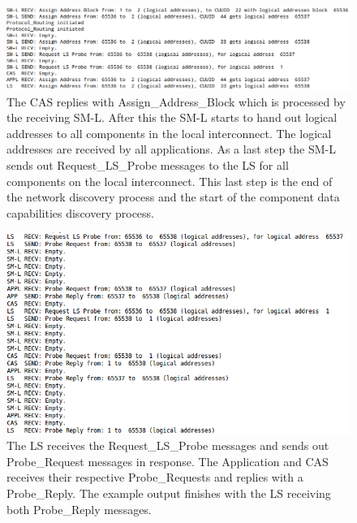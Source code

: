 \begin{figure}[ht]
    \centering
    \includegraphics[width=\textwidth]{figures/code_part_2}
    \caption{The CAS replies with Assign\_Address\_Block which is processed by
    the receiving SM-L. After this the SM-L starts to hand out logical
addresses to all components in the local interconnect. The logical addresses
are received by all applications. As a last step the SM-L sends out
Request\_LS\_Probe messages to the LS for all components on the local
interconnect. This last step is the end of the network discovery process and
the start of the component data capabilities discovery process.}
    \label{fig:code_part_2}
\end{figure}

\begin{figure}[ht]
    \centering
    \includegraphics[width=\textwidth]{figures/code_part_3}
    \caption{The LS receives the Request\_LS\_Probe messages and sends out
    Probe\_Request messages in response. The Application and CAS receives their
    respective Probe\_Requests and replies with a Probe\_Reply. The example
output finishes with the LS receiving both Probe\_Reply messages.}
    \label{fig:code_part_3}
\end{figure}
